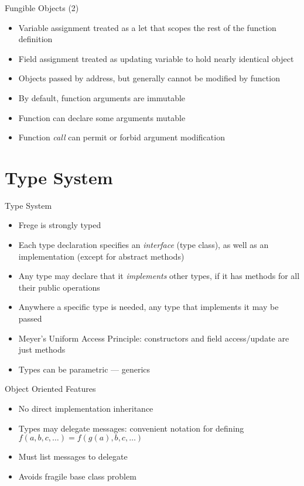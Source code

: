 \documentclass[12pt]{beamer}
\newcommand{\frege}{\textsf{Frege}\xspace}
\begin{document}
\begin{frame}{\LARGE Fungible Objects (2)}
  \begin{itemize}
  \item Variable assignment treated as a \textsf{let} that scopes the rest of
    the function definition
  \item Field assignment treated as updating variable to hold nearly
    identical object
  \item Objects passed by address, but generally cannot be modified by
    function
  \item By default, function arguments are immutable
  \item Function can declare some arguments mutable
  \item Function \emph{call} can permit or forbid argument modification
  \end{itemize}
\end{frame}


\section{Type System}
\begin{frame}{\LARGE Type System}
  \begin{itemize}
  \item \frege is strongly typed
  \item Each type declaration specifies an \emph{interface} (type class), as
    well as an implementation (except for abstract methods)
  \item Any type may declare that it \emph{implements} other types, if it has
    methods for all their public operations
  \item Anywhere a specific type is needed, any type that implements it may
    be passed
  \item Meyer's Uniform Access Principle: constructors and field
    access/update are just methods
  \item Types can be parametric --- generics
  \end{itemize}
\end{frame}


\begin{frame}{\LARGE Object Oriented Features}
  \begin{itemize}
  \item No direct implementation inheritance
  \item Types may delegate messages:  convenient notation for defining
    $f(a, b, c, \ldots) = f(g(a), b, c, \ldots)$
  \item Must list messages to delegate
  \item Avoids fragile base class problem
  \end{itemize}
\end{frame}


\end{document}
